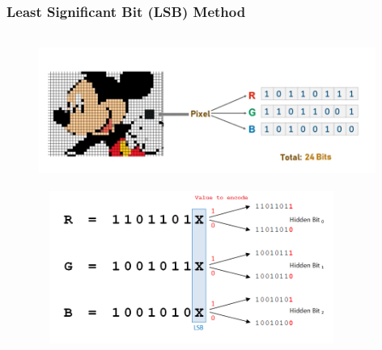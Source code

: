 \documentclass[12pt,hyperref={unicode}]{beamer}
\begin{document}
\begin{frame}
\frametitle{Least Significant Bit (LSB) Method}
\begin{figure}
    \begin{overprint}
        \centering\includegraphics[width=11cm, height=5cm]{0 yARnljvGACzlItk-.png}
        \centering\includegraphics[width=10cm, height=5cm]{encode.png}
    \end{overprint}
\end{figure}
\end{frame}

\end{document}
